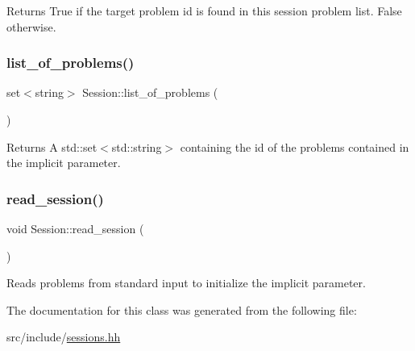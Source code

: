 \begin{DoxyReturn}{Returns}
True if the target problem id is found in this session problem list. False otherwise. 
\end{DoxyReturn}
\mbox{\label{classSession_a571f2f08abc58c6670c78b922ffaade4}} 
\subsubsection{\texorpdfstring{list\+\_\+of\+\_\+problems()}{list\_of\_problems()}}
{\footnotesize\ttfamily set$<$string$>$ Session\+::list\+\_\+of\+\_\+problems (\begin{DoxyParamCaption}{ }\end{DoxyParamCaption})}

\begin{DoxyReturn}{Returns}
A std\+::set$<$std\+::string$>$ containing the id of the problems contained in the implicit parameter. 
\end{DoxyReturn}
\mbox{\label{classSession_a75f5a103f7251936bde1183acae2b97e}} 
\subsubsection{\texorpdfstring{read\+\_\+session()}{read\_session()}}
{\footnotesize\ttfamily void Session\+::read\+\_\+session (\begin{DoxyParamCaption}{ }\end{DoxyParamCaption})}

Reads problems from standard input to initialize the implicit parameter. 

The documentation for this class was generated from the following file\+:\begin{DoxyCompactItemize}
\item 
src/include/\hyperlink{sessions_8hh}{sessions.\+hh}\end{DoxyCompactItemize}
